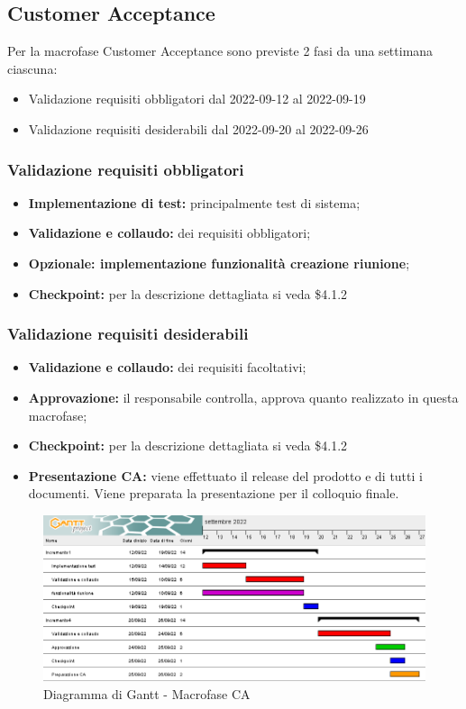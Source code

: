 \subsection{Customer Acceptance}
Per la macrofase Customer Acceptance sono previste 2 fasi da una settimana ciascuna:
\begin{itemize}
    \item Validazione requisiti obbligatori dal 2022-09-12 al 2022-09-19
    \item Validazione requisiti desiderabili dal 2022-09-20 al 2022-09-26
\end{itemize}
\subsubsection{Validazione requisiti obbligatori}
\begin{itemize}
    \item \textbf{Implementazione di test:} principalmente test di sistema;
    \item \textbf{Validazione e collaudo:} dei requisiti obbligatori;
    \item \textbf{Opzionale: implementazione funzionalità creazione riunione};
    \item \textbf{Checkpoint:} per la descrizione dettagliata si veda \$4.1.2
\end{itemize}
\subsubsection{Validazione requisiti desiderabili}
\begin{itemize}
    \item \textbf{Validazione e collaudo:} dei requisiti facoltativi;
    \item \textbf{Approvazione:} il responsabile controlla, approva quanto realizzato in questa macrofase;
    \item \textbf{Checkpoint:} per la descrizione dettagliata si veda \$4.1.2
    \item \textbf{Presentazione CA:} viene effettuato il release del prodotto e di tutti i documenti. Viene preparata la presentazione per il colloquio finale.
\end{itemize}
\begin{figure}[H]
	\includegraphics[width=\linewidth]{images/CA.png}
    \caption{Diagramma di Gantt - Macrofase CA}
\end{figure}
\newpage